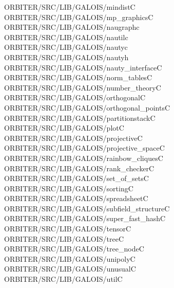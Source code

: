 \begin{tabbing}
ORBITER/SRC/LIB/GALOIS/mindistC\\[0pt]
ORBITER/SRC/LIB/GALOIS/mp\_graphicsC\\[0pt]
ORBITER/SRC/LIB/GALOIS/naugraphc\\[0pt]
ORBITER/SRC/LIB/GALOIS/nautilc\\[0pt]
ORBITER/SRC/LIB/GALOIS/nautyc\\[0pt]
ORBITER/SRC/LIB/GALOIS/nautyh\\[0pt]
ORBITER/SRC/LIB/GALOIS/nauty\_interfaceC\\[0pt]
ORBITER/SRC/LIB/GALOIS/norm\_tablesC\\[0pt]
ORBITER/SRC/LIB/GALOIS/number\_theoryC\\[0pt]
ORBITER/SRC/LIB/GALOIS/orthogonalC\\[0pt]
ORBITER/SRC/LIB/GALOIS/orthogonal\_pointsC\\[0pt]
ORBITER/SRC/LIB/GALOIS/partitionstackC\\[0pt]
ORBITER/SRC/LIB/GALOIS/plotC\\[0pt]
ORBITER/SRC/LIB/GALOIS/projectiveC\\[0pt]
ORBITER/SRC/LIB/GALOIS/projective\_spaceC\\[0pt]
ORBITER/SRC/LIB/GALOIS/rainbow\_cliquesC\\[0pt]
ORBITER/SRC/LIB/GALOIS/rank\_checkerC\\[0pt]
ORBITER/SRC/LIB/GALOIS/set\_of\_setsC\\[0pt]
ORBITER/SRC/LIB/GALOIS/sortingC\\[0pt]
ORBITER/SRC/LIB/GALOIS/spreadsheetC\\[0pt]
ORBITER/SRC/LIB/GALOIS/subfield\_structureC\\[0pt]
ORBITER/SRC/LIB/GALOIS/super\_fast\_hashC\\[0pt]
ORBITER/SRC/LIB/GALOIS/tensorC\\[0pt]
ORBITER/SRC/LIB/GALOIS/treeC\\[0pt]
ORBITER/SRC/LIB/GALOIS/tree\_nodeC\\[0pt]
ORBITER/SRC/LIB/GALOIS/unipolyC\\[0pt]
ORBITER/SRC/LIB/GALOIS/unusualC\\[0pt]
ORBITER/SRC/LIB/GALOIS/utilC\\[0pt]

\end{tabbing}
